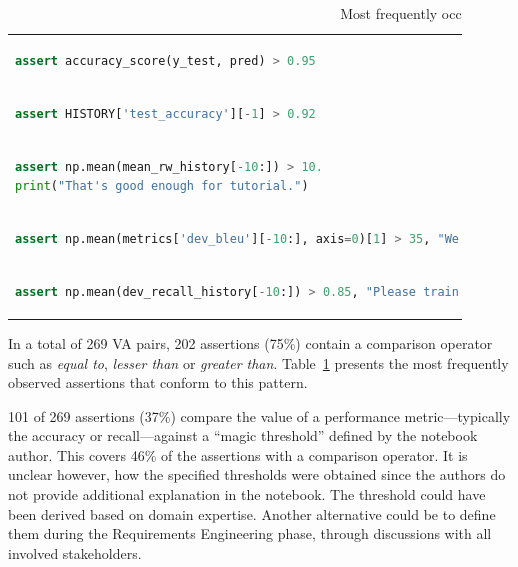 \documentclass[conference]{IEEEtran}
\begin{document}
\begin{table}
  \centering
  \caption{Most frequently occurring assertions that use a comparison operator.}
  \begin{tabular}{@{}m{0.9\linewidth}@{}}
    \toprule
    \begin{lstlisting}[language=Python,belowskip=0pt,aboveskip=0pt]
assert accuracy_score(y_test, pred) > 0.95\end{lstlisting}\\
    \begin{lstlisting}[language=Python,belowskip=0pt,aboveskip=0pt]
assert HISTORY['test_accuracy'][-1] > 0.92\end{lstlisting}\\
    \begin{lstlisting}[language=Python,belowskip=0pt,aboveskip=0pt]
assert np.mean(mean_rw_history[-10:]) > 10.
print("That's good enough for tutorial.")\end{lstlisting}\\
    \begin{lstlisting}[language=Python,belowskip=0pt,aboveskip=0pt]
assert np.mean(metrics['dev_bleu'][-10:], axis=0)[1] > 35, "We kind of need a higher bleu BLEU from you. Kind of right now."\end{lstlisting}\\
    \begin{lstlisting}[language=python,belowskip=0pt,aboveskip=0pt]
assert np.mean(dev_recall_history[-10:]) > 0.85, "Please train for at least 85% recall on test set. You may need to change vectorizer model for that."
    \end{lstlisting}\\
    \bottomrule
  \end{tabular}
  \label{tab:compare-op-asserts}
\end{table}

In a total of 269 VA pairs, 202 assertions (75\%) contain a comparison operator such as \emph{equal to}, \emph{lesser than} or \emph{greater than}. Table~\ref{tab:compare-op-asserts} presents the most frequently observed assertions that conform to this pattern.

101 of 269 assertions (37\%) compare the value of a performance metric---typically the accuracy or recall---against a ``magic threshold'' defined by the notebook author. This covers 46\% of the assertions with a comparison operator. It is unclear however, how the specified thresholds were obtained since the authors do not provide additional explanation in the notebook. The threshold could have been derived based on domain expertise. Another alternative could be to define them during the Requirements Engineering phase, through discussions with all involved stakeholders\cite{vogelsang2019requirements,rahimi2019toward}.
\end{document}
